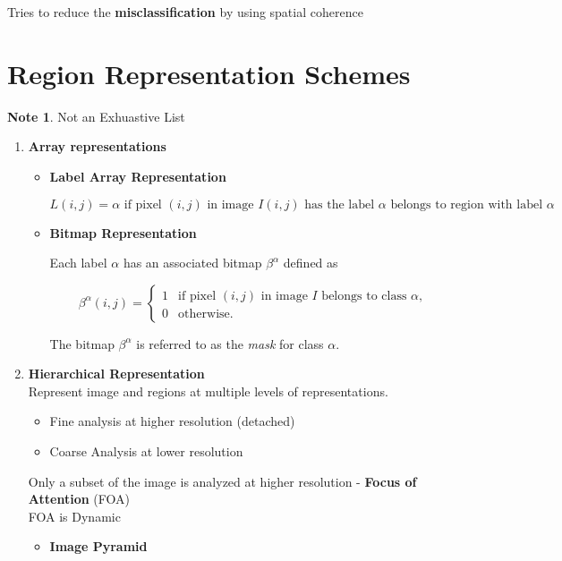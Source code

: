 \documentclass[11pt]{article}
\theoremstyle{definition}
\newtheorem*{unnote}{Note}  %
\begin{document}
Tries to reduce the \textbf{misclassification} by using spatial coherence

\newpage
\section{Region Representation Schemes}
\begin{unnote}
    Not an Exhuastive List 
\end{unnote}

\begin{enumerate}

    \item \textbf{Array representations}
    
    \begin{itemize}
    
        \item \textbf{Label Array Representation}
        
        \begin{equation}
        L(i, j) = \alpha 
        \text{ if pixel } (i, j) \text{ in image } I(i, j) 
        \text{ has the label } \alpha 
        \text{ belongs to region with label } \alpha
        \end{equation}
        
        
        \item \textbf{Bitmap Representation}
        
        Each label $\alpha$ has an associated bitmap $\beta^{\alpha}$ defined as
        
        \begin{equation}
        \beta^{\alpha}(i,j) =
        \begin{cases}
        1 & \text{if pixel } (i,j) \text{ in image } I \text{ belongs to class } \alpha, \\
        0 & \text{otherwise.}
        \end{cases}
        \end{equation}
        
        The bitmap $\beta^{\alpha}$ is referred to as the \textit{mask} for class $\alpha$.
    
    \end{itemize}

    \item \textbf{Hierarchical Representation} \\
    Represent image and regions at multiple levels of representations.
    \begin{itemize}
        \item Fine analysis at higher resolution (detached)
        \item Coarse Analysis at lower resolution
    \end{itemize}
    
    Only a subset of the image is analyzed at higher resolution - \textbf{Focus of Attention} (FOA) \\
    FOA is Dynamic 
    \begin{itemize}
        \item \textbf{Image Pyramid}
    \end{itemize}
\end{enumerate}
\end{document}
